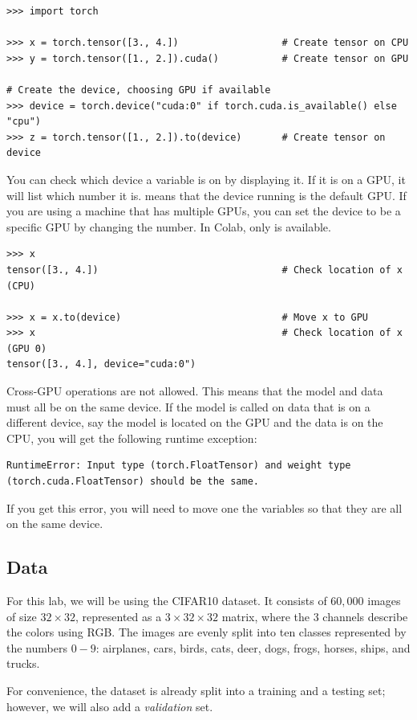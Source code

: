 \begin{lstlisting}
>>> import torch

>>> x = torch.tensor([3., 4.])					# Create tensor on CPU
>>> y = torch.tensor([1., 2.]).cuda()			# Create tensor on GPU

# Create the device, choosing GPU if available
>>> device = torch.device("cuda:0" if torch.cuda.is_available() else "cpu")
>>> z = torch.tensor([1., 2.]).to(device)		# Create tensor on device
\end{lstlisting}
You can check which device a variable is on by displaying it.
If it is on a GPU, it will list which number it is.
 means that the device running is the default GPU.
If you are using a machine that has multiple GPUs, you can set the device to be a specific GPU by changing the number.
In Colab, only  is available.
\begin{lstlisting}
>>> x
tensor([3., 4.])								# Check location of x (CPU)

>>> x = x.to(device)							# Move x to GPU
>>> x											# Check location of x (GPU 0)
tensor([3., 4.], device="cuda:0")
\end{lstlisting}

\begin{warn}
Cross-GPU operations are not allowed.
This means that the model and data must all be on the same device.
If the model is called on data that is on a different device, say the model is located on the GPU and the data is on the CPU, you will get the following runtime exception:
\begin{lstlisting}
RuntimeError: Input type (torch.FloatTensor) and weight type (torch.cuda.FloatTensor) should be the same.
\end{lstlisting}
If you get this error, you will need to move one the variables so that they are all on the same device.
\end{warn}

\subsection*{Data}
For this lab, we will be using the CIFAR10 dataset.
It consists of $60,000$ images of size $32\times32$, represented as a $3\times 32\times 32$ matrix, where the 3 channels describe the colors using RGB.
The images are evenly split into ten classes represented by the numbers $0-9$:  airplanes, cars, birds, cats, deer, dogs, frogs, horses, ships, and trucks.

For convenience, the dataset is already split into a training and a testing set; however, we will also add a \emph{validation} set.

